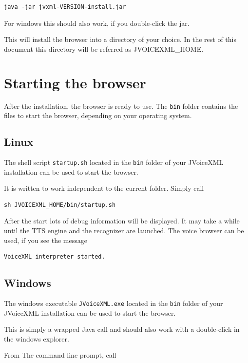 \documentclass[11pt,a4paper]{article}
\begin{document}
\begin{lstlisting}
java -jar jvxml-VERSION-install.jar
\end{lstlisting}

For windows this should also work, if you double-click the jar. 

This will install the browser into a directory of your choice. In the rest of 
this document this directory will be referred as JVOICE\-XML\_HOME.

\section{Starting the browser}

After the installation, the browser is ready to use. 
The \texttt{bin} folder contains the files to start the browser,
depending on your operating system.

\subsection{Linux}

The shell script \texttt{startup.sh} located in the \texttt{bin} folder
of your JVoiceXML installation can be used to start the browser.

It is written to work independent to the current folder. Simply call

\begin{lstlisting}
sh JVOICEXML_HOME/bin/startup.sh
\end{lstlisting}

After the start lots of debug information will be displayed.
It may take a while until the TTS engine and the recognizer are launched.
The voice browser can be used, if you see the message

\begin{lstlisting}
VoiceXML interpreter started.
\end{lstlisting}

\subsection{Windows}

The windows executable \texttt{JVoiceXML.exe} located in the \texttt{bin}
folder of your JVoiceXML installation can be used to start the browser.

This is simply a wrapped Java call and should also work with a double-click
in the windows explorer.

From The command line prompt, call
\end{document}
